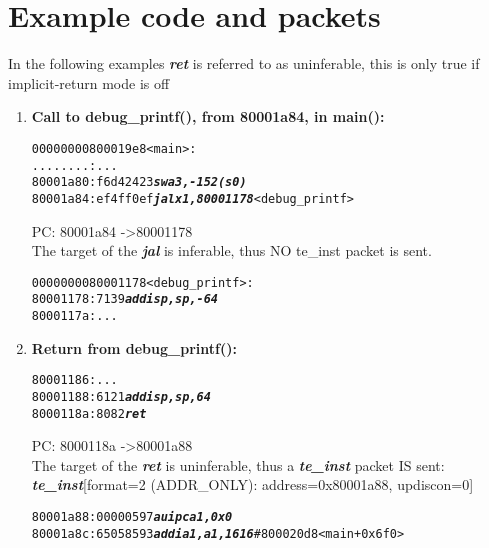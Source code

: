 \chapter{Example code and packets}

  In the following examples \textbf{\textit{ret}} is referred to as
  uninferable, this is only true if implicit-return mode is off

\begin{enumerate}
\item
  \textbf{Call to debug\_printf(), from 80001a84, in main():}
  \begin {alltt}
00000000800019e8 <main>:
    ........:	...
    80001a80:	f6d42423          	 \textbf{\textit{sw	a3,-152(s0)}}
    80001a84:	ef4ff0ef          	 \textbf{\textit{jal	x1,80001178}} <debug\_printf>
  \end{alltt}

  \begin{frame}

    PC: 80001a84 -\textgreater 80001178 \\
    The target of the \textbf{\textit{jal}} is inferable, thus NO te\_inst packet is sent.\\
  \end{frame}
\begin {alltt}

0000000080001178 <debug\_printf>:
    80001178:	7139                	\textbf{\textit{addi	sp,sp,-64}}
    8000117a:	...
  \end{alltt}

\item
  \textbf{Return from debug\_printf():}
  \begin{alltt}
    80001186:	...
    80001188:	6121                	\textbf{\textit{addi	sp,sp,64}}
    8000118a:	8082                	\textbf{\textit{ret}}
  \end{alltt}

  \begin{frame}

    PC: 8000118a -\textgreater 80001a88 \\
    The target of the  \textbf{\textit{ret}} is uninferable, thus a \textbf{\textit{te\_inst}} packet IS sent:\\
    \textbf{\textit{te\_inst}}[format=2 (ADDR\_ONLY): address=0x80001a88, updiscon=0]
  \end{frame}

  \begin{alltt}
    80001a88:	00000597          	\textbf{\textit{auipc	a1,0x0}}
    80001a8c:	65058593          	\textbf{\textit{addi	a1,a1,1616}} # 800020d8 <main+0x6f0>
  \end{alltt}



\end{enumerate}
